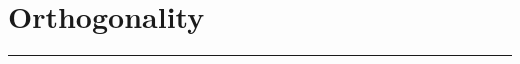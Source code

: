 \documentclass[
10pt, %
a4paper, %
oneside, %
headinclude,footinclude, %
BCOR5mm, %
]{scrartcl}
\begin{document}
\newpage



\section{Orthogonality}
\hrule
\vspace{0.5cm}
\end{document}
